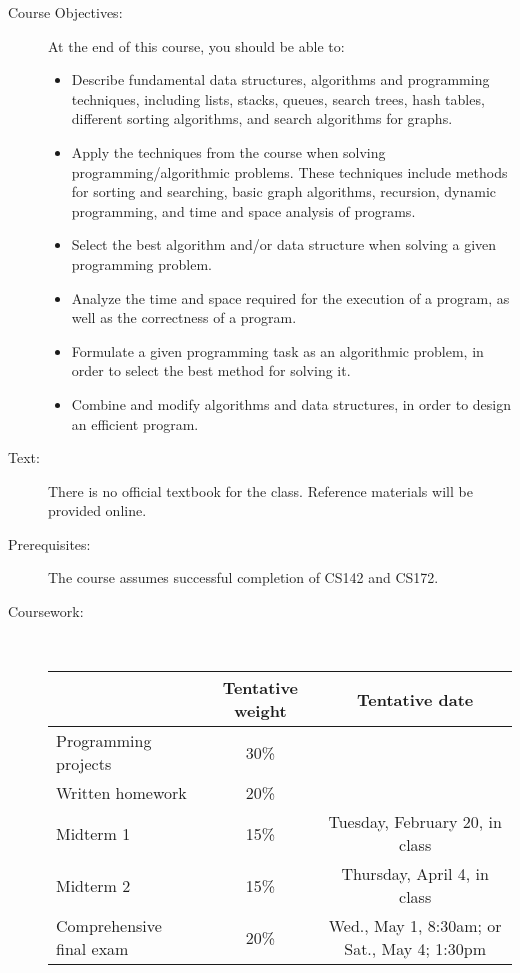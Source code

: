 \documentclass [letterpaper,11pt]{article}
\begin{document}
\begin{description}
\item[Course Objectives:]
At the end of this course, you should be able to:
\begin{itemize} \setlength{\itemsep}{0em}\setlength{\parskip}{0pt}
	\item Describe fundamental data structures, algorithms and programming techniques, including lists, stacks, queues, search trees, hash tables, different sorting algorithms,  and search algorithms for graphs.
	\item Apply the techniques from the course when solving programming/algorithmic problems. These techniques include methods for sorting and searching, basic graph algorithms, recursion, dynamic programming, and time and space analysis of programs.
	\item Select the best algorithm and/or data structure when solving a given programming problem.
	\item Analyze the time and space required for the execution of a program, as well as the correctness of a program.
	\item Formulate a given programming task as an algorithmic problem, in order to select the best method for solving it.
	\item Combine and modify algorithms and data structures, in order to design an efficient program.
\end{itemize}


\item[Text:]
   There is no official textbook for the class.  Reference materials will be provided online. 

\item[Prerequisites:]
The course assumes successful completion of CS142 and CS172.

\item[Coursework:] \

\begin{tabular}{lcc} 
& Tentative weight & Tentative date \\ \hline
Programming projects & 30\% & \\
Written homework & 20\% & \\
Midterm 1 & 15\% & Tuesday, February 20, in class  \\
Midterm 2 & 15\% & Thursday, April 4, in class\\
Comprehensive final exam & 20\% & Wed., May 1, 8:30am; or Sat., May 4; 1:30pm\\
\end{tabular}


\end{description}
\end{document}
